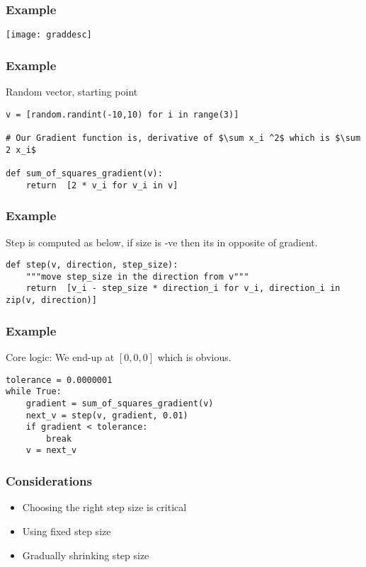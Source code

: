 \begin{frame}[fragile]\frametitle{Example}
\begin{center}
\texttt{[image: graddesc]}
\end{center}
\end{frame}

\begin{frame}[fragile]\frametitle{Example}
Random vector, starting point
\begin{lstlisting}
v = [random.randint(-10,10) for	i in range(3)]

# Our Gradient function is, derivative of $\sum x_i ^2$ which is $\sum 2 x_i$

def sum_of_squares_gradient(v):
	return	[2 * v_i for v_i in v]
\end{lstlisting}
\end{frame}

\begin{frame}[fragile]\frametitle{Example}
Step is computed as below, if size is -ve then its in opposite of gradient.
\begin{lstlisting}
def step(v, direction, step_size):
	"""move step_size in the direction from v"""
	return	[v_i - step_size * direction_i for v_i, direction_i in zip(v, direction)]
\end{lstlisting}
\end{frame}

\begin{frame}[fragile]\frametitle{Example}
Core logic: We end-up at $[0,0,0]$ which is obvious.

\begin{lstlisting}
tolerance = 0.0000001
while True:
	gradient = sum_of_squares_gradient(v) 
	next_v = step(v, gradient, 0.01) 
	if gradient < tolerance: 
		break
	v = next_v																			
\end{lstlisting}
\end{frame}

\begin{frame}[fragile]\frametitle{Considerations}
\begin{itemize}
\item Choosing the right step size is critical
\item Using fixed step size
\item Gradually shrinking step size
\end{itemize}
\end{frame}


